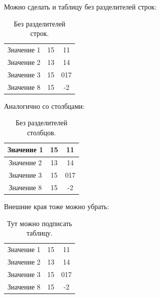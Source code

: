 \documentclass[a4paper, 12pt]{article}
\begin{document}
Можно сделать и таблицу без разделителей строк:
\begin{table}[h!]
    \centering
    \caption{Без разделителей строк.}
	\begin{tabular}{|c|c|c|}
 \hline
 Значение 1 & 15 & 11 \\
 Значение 2 & 13 & 14\\ 
 Значение 3 & 15 & 017 \\ 
 Значение 8 & 15 & -2 \\ \hline
	\end{tabular}
\end{table}

\newpage
Аналогично со столбцами:
\begin{table}[h!]
    \centering
    \caption{Без разделителей столбцов.}
	\begin{tabular}{|ccc|}
 \hline
 Значение 1 & 15 & 11 \\ \hline
 Значение 2 & 13 & 14\\ \hline
 Значение 3 & 15 & 017 \\ \hline
 Значение 8 & 15 & -2 \\ \hline
	\end{tabular}
\end{table}


Внешние края тоже можно убрать:
\begin{table}[h!]
    \centering
    \caption{Тут можно подписать таблицу.}
	\begin{tabular}{ccc}
 Значение 1 & 15 & 11 \\ 
 Значение 2 & 13 & 14\\ 
 Значение 3 & 15 & 017 \\ 
 Значение 8 & 15 & -2 \\
	\end{tabular}
\end{table}
\end{document}
